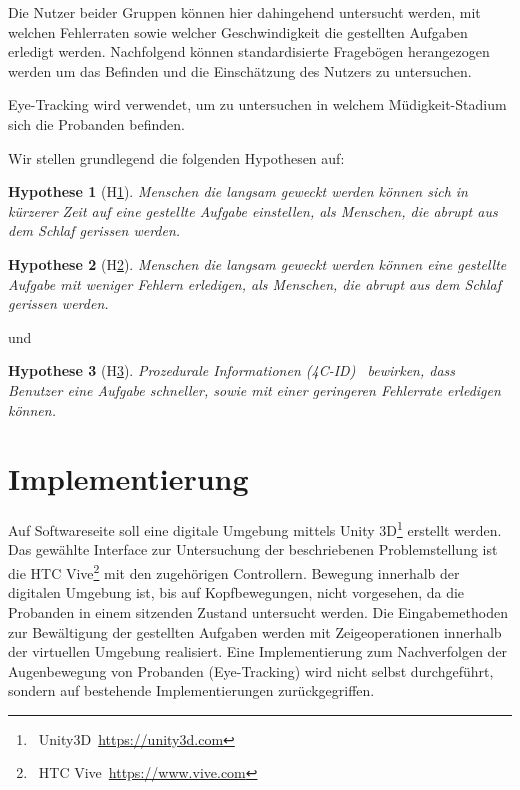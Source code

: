 \documentclass[a4paper, 11pt]{article}
\newtheorem{hyp}{Hypothese}
\begin{document}
Die Nutzer beider Gruppen können hier dahingehend untersucht werden, mit welchen Fehlerraten sowie welcher Geschwindigkeit die gestellten Aufgaben erledigt werden. Nachfolgend können standardisierte Fragebögen herangezogen werden um das Befinden und die Einschätzung des Nutzers zu untersuchen.

Eye-Tracking wird verwendet, um zu untersuchen in welchem Müdigkeit-Stadium sich die Probanden befinden.

Wir stellen grundlegend die folgenden Hypothesen auf:
\begin{hyp}[H\ref{hyp:schneller}]\label{hyp:schneller}
	Menschen die langsam geweckt werden können sich in kürzerer Zeit auf eine gestellte Aufgabe einstellen, als Menschen, die abrupt aus dem Schlaf gerissen werden.
\end{hyp}

\begin{hyp}[H\ref{hyp:erfolgreicher}]\label{hyp:erfolgreicher}
	Menschen die langsam geweckt werden können eine gestellte Aufgabe mit weniger Fehlern erledigen, als Menschen, die abrupt aus dem Schlaf gerissen werden.
\end{hyp}

und

\begin{hyp}[H\ref{hyp:gestaltung}]\label{hyp:gestaltung}
    Prozedurale Informationen (4C-ID)~\cite{van2002blueprints} bewirken, dass Benutzer eine Aufgabe schneller, sowie mit einer geringeren Fehlerrate erledigen können.
\end{hyp}

\section*{Implementierung}
Auf Softwareseite soll eine digitale Umgebung mittels Unity 3D\footnote{~Unity3D~\url{https://unity3d.com}} erstellt werden. Das gewählte Interface zur Untersuchung der beschriebenen Problemstellung ist die HTC Vive\footnote{~HTC Vive~\url{https://www.vive.com}} mit den zugehörigen Controllern. Bewegung innerhalb der digitalen Umgebung ist, bis auf Kopfbewegungen, nicht vorgesehen, da die Probanden in einem sitzenden Zustand untersucht werden. Die Eingabemethoden zur Bewältigung der gestellten Aufgaben werden mit Zeigeoperationen innerhalb der virtuellen Umgebung realisiert. Eine Implementierung zum Nachverfolgen der Augenbewegung von Probanden (Eye-Tracking) wird nicht selbst durchgeführt, sondern auf bestehende Implementierungen zurückgegriffen. 
\end{document}
